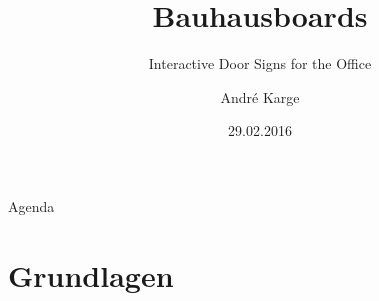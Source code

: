 \documentclass[11pt]{beamer}
\title[Bauhausboards]{Bauhausboards}
\subtitle{Interactive Door Signs for the Office}
\author[André Karge]{André Karge}
\institute[Bauhaus-Universität Weimar]{}
\date[29.02.2016]{29.02.2016}
\begin{document}

\maketitle

\begin{frame}{Agenda}
\tableofcontents
\end{frame}
\section{Grundlagen}
\end{document}
